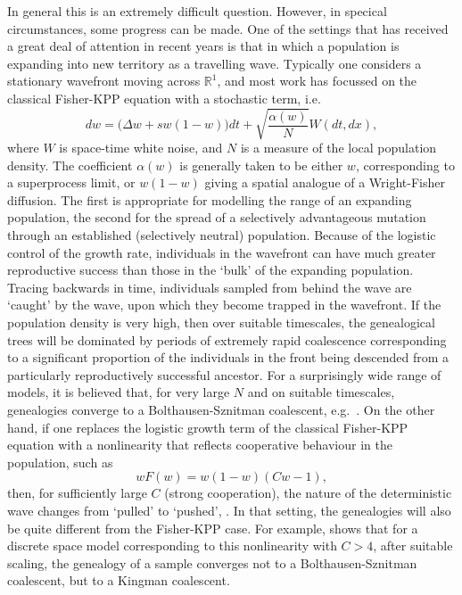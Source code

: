 \documentclass[12pt]{article}
\newcommand{\IR}{\mathbb R}
\begin{document}
In general this is an extremely difficult question. However, in specical
circumstances, some progress can be made. One of the settings that
has received a great deal of attention in recent years is that in which 
a population is expanding into new territory as a travelling wave. 
Typically one considers a stationary wavefront moving across $\IR^1$, and
most work has focussed on the classical Fisher-KPP equation with a 
stochastic term, i.e.
$$dw=\big(\Delta w +sw(1-w)\Big)dt +\sqrt{\frac{\alpha(w)}{N}}W(dt,dx),$$
where $W$ is space-time white noise, and $N$ is a measure of the 
local population density. The coefficient
$\alpha(w)$ is generally taken to be either
$w$, corresponding to a superprocess limit, or $w(1-w)$ giving a 
spatial analogue of a Wright-Fisher diffusion. The first is 
appropriate for modelling the range of an expanding population,
the second for the spread of a selectively advantageous 
mutation through an established (selectively neutral) population. 
Because of the logistic control of the growth rate,
individuals in the wavefront can have much greater reproductive success
than those in the `bulk' of the expanding population. 
Tracing backwards in time, individuals sampled
from behind the wave are `caught' by the wave, upon which they become
trapped in the wavefront. If the population density is very high, then over
suitable timescales, the genealogical trees will be dominated by 
periods of extremely rapid coalescence corresponding to a significant 
proportion of the individuals in the front being descended from a particularly
reproductively successful ancestor. For a surprisingly wide range of models, 
it is believed that, for very large $N$ and on suitable timescales, 
genealogies converge to a 
Bolthausen-Sznitman coalescent, e.g.~\cite{brunet/derrida/mueller/munier:2007}. 
On the other hand, if one replaces the logistic growth term of the classical
Fisher-KPP equation with a nonlinearity that reflects cooperative
behaviour in the population, such as
$$wF(w)=w(1-w)(Cw-1),$$
then, for sufficiently large $C$ (strong cooperation),
the nature of the deterministic
wave changes from `pulled' to `pushed', \cite{birzu/hallatschek/korolev:2017}.
In that setting, the genealogies will also be quite different
from the Fisher-KPP case. For example, \cite{etheridge/penington:2020}
shows that for a discrete space model corresponding to this 
nonlinearity with $C>4$, after suitable scaling, the genealogy of a
sample converges not to a Bolthausen-Sznitman coalescent, but to
a Kingman coalescent. 
\end{document}
